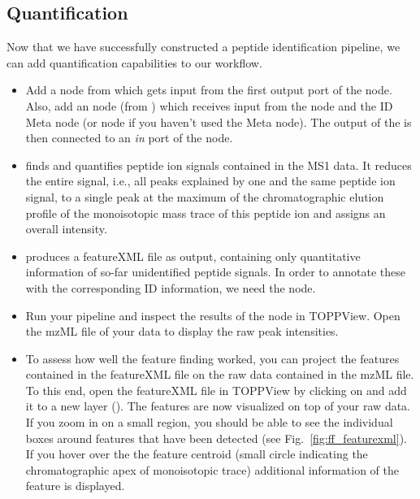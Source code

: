 \newpage
\subsection{Quantification}
\label{Labelfree_Quantification}

Now that we have successfully constructed a peptide identification pipeline, we can add quantification capabilities to our workflow.

\begin{itemize}
\item
Add a  node from  which gets input from the first output port of the  node. Also, add an  node (from ) which receives input from the  node and the ID Meta node (or  node if you haven't used the Meta node).
The output of the  is then connected to an \textit{in} port of the  node.
\item
{} finds and quantifies peptide ion signals contained in the MS1 data.
It reduces the entire signal, i.e., all peaks explained by one and the same peptide ion signal, to a single peak at the maximum of the chromatographic elution profile of the monoisotopic mass trace of this peptide ion and assigns an overall intensity.
\item
{} produces a featureXML file as output, containing only quantitative information of so-far unidentified peptide signals.
In order to annotate these with the corresponding ID information, we need the  node.
\item Run your pipeline and inspect the results of the  node in TOPPView. Open the mzML file of your data to display the raw peak intensities.
\item To assess how well the feature finding worked, you can project the features contained in the featureXML file on the raw data contained in the mzML file. To this end, open the featureXML file in TOPPView by clicking on  and add it to a new layer (). The features are now visualized on top of your raw data. If you zoom in on a small region, you should be able to see the individual boxes around features that have been detected (see Fig.~\ref{fig:ff_featurexml}). If you hover over the the feature centroid (small circle indicating the chromatographic apex of monoisotopic trace) additional information of the feature is displayed.


\end{itemize}
